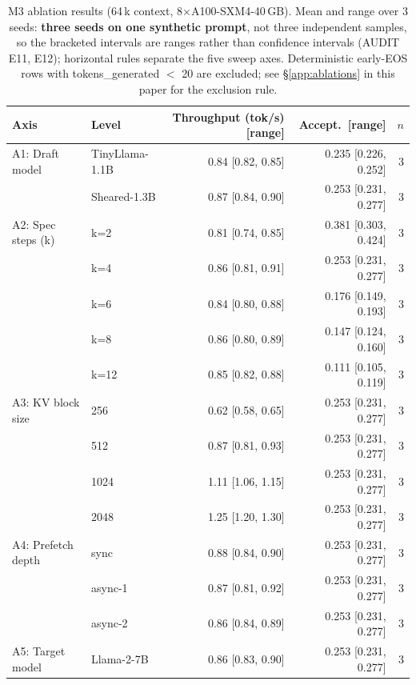 \begin{table}[h]
\centering
\caption{M3 ablation results (64\,k context, 8$\times$A100-SXM4-40\,GB). Mean and range over 3 seeds: \textbf{three seeds on one synthetic prompt}, not three independent samples, so the bracketed intervals are ranges rather than confidence intervals (AUDIT E11, E12); horizontal rules separate the five sweep axes. Deterministic early-EOS rows with tokens\_generated $<$ 20 are excluded; see \S\ref{app:ablations} in this paper for the exclusion rule.}
\label{tab:m3-ablation}
\small\setlength{\tabcolsep}{3pt}\begin{tabular}{p{3.05cm}p{2.15cm}rrr}
\toprule
Axis & Level & Throughput (tok/s) [range] & Accept.\ [range] & $n$ \\
\midrule
A1: Draft model & TinyLlama-1.1B & 0.84 [0.82, 0.85] & 0.235 [0.226, 0.252] & 3 \\
 & Sheared-1.3B & 0.87 [0.84, 0.90] & 0.253 [0.231, 0.277] & 3 \\
\midrule
A2: Spec steps (k) & k=2 & 0.81 [0.74, 0.85] & 0.381 [0.303, 0.424] & 3 \\
 & k=4 & 0.86 [0.81, 0.91] & 0.253 [0.231, 0.277] & 3 \\
 & k=6 & 0.84 [0.80, 0.88] & 0.176 [0.149, 0.193] & 3 \\
 & k=8 & 0.86 [0.80, 0.89] & 0.147 [0.124, 0.160] & 3 \\
 & k=12 & 0.85 [0.82, 0.88] & 0.111 [0.105, 0.119] & 3 \\
\midrule
A3: KV block size & 256 & 0.62 [0.58, 0.65] & 0.253 [0.231, 0.277] & 3 \\
 & 512 & 0.87 [0.81, 0.93] & 0.253 [0.231, 0.277] & 3 \\
 & 1024 & 1.11 [1.06, 1.15] & 0.253 [0.231, 0.277] & 3 \\
 & 2048 & 1.25 [1.20, 1.30] & 0.253 [0.231, 0.277] & 3 \\
\midrule
A4: Prefetch depth & sync & 0.88 [0.84, 0.90] & 0.253 [0.231, 0.277] & 3 \\
 & async-1 & 0.87 [0.81, 0.92] & 0.253 [0.231, 0.277] & 3 \\
 & async-2 & 0.86 [0.84, 0.89] & 0.253 [0.231, 0.277] & 3 \\
\midrule
A5: Target model & Llama-2-7B & 0.86 [0.83, 0.90] & 0.253 [0.231, 0.277] & 3 \\
\bottomrule
\end{tabular}
\end{table}
